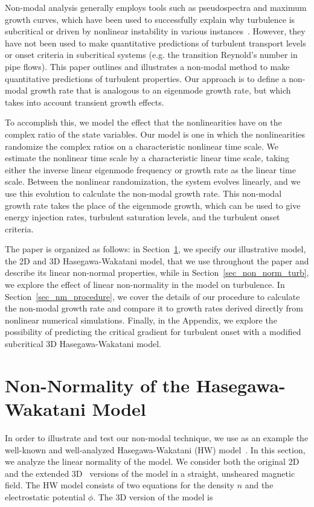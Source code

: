 \documentclass[twocolumn,showkeys,superscriptaddress]{revtex4}
\begin{document}
Non-modal analysis generally employs tools such as pseudospectra and maximum growth curves, which have been used to successfully explain
why turbulence is subcritical or driven by nonlinear instability in various instances~\cite{trefethen1993,camargo1998}. 
However, they have not been used to make quantitative predictions of turbulent transport levels or onset criteria in subcritical systems (e.g. the transition Reynold's number in pipe flows).
This paper outlines and illustrates a non-modal method to make quantitative predictions of turbulent properties. 
Our approach is to define a non-modal growth rate that is analogous to an eigenmode growth rate, but which takes into account transient growth effects. 

To accomplish this, we model the effect that the nonlinearities have on the complex ratio of the state variables. Our model is one in which the 
nonlinearities randomize the complex ratios on a characteristic nonlinear time scale.
We estimate the nonlinear time scale by a characteristic linear time scale, taking either the inverse linear eigenmode frequency or growth rate as the linear time scale.
Between the nonlinear randomization, the system evolves linearly, and we use this evolution to calculate the non-modal growth rate. 
This non-modal growth rate takes the place of the eigenmode growth, which can be used
to give energy injection rates, turbulent saturation levels, and the turbulent onset criteria.

The paper is organized as follows: in Section~\ref{sec_hw_model}, we specify our illustrative model, the 2D and 3D Hasegawa-Wakatani model,
that we use throughout the paper and describe its linear non-normal properties,  while in Section~\ref{sec_non_norm_turb}, we explore the effect of linear non-normality in the model on turbulence. 
In Section~\ref{sec_nm_procedure}, we cover the details of our procedure to calculate the non-modal growth rate and compare it to growth rates derived directly from nonlinear numerical simulations. 
Finally, in the Appendix, we explore the possibility of predicting the critical gradient for turbulent onset with a modified subcritical 3D Hasegawa-Wakatani model.

\section{Non-Normality of the Hasegawa-Wakatani Model} 
\label{sec_hw_model}

In order to illustrate and test our non-modal technique, we use as an example the well-known and well-analyzed Hasegawa-Wakatani (HW) model~\cite{hasegawa1983}.
In this section, we analyze the linear normality of the model.
We consider both the original 2D and the extended 3D~\cite{biskamp1995} versions of the model in a straight, unsheared magnetic field. 
The HW model consists of two equations for the density $n$ and the electrostatic potential $\phi$. The 3D version of the model is
\end{document}

